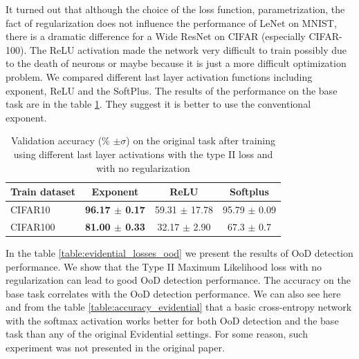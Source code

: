 \documentclass{article}
\begin{document}
It turned out that although the choice of the loss function, parametrization, the fact of regularization does not influence the performance of LeNet on MNIST, there is a dramatic difference for a Wide ResNet on CIFAR (especially CIFAR-100).
The ReLU activation made the network very difficult to train possibly due to the death of neurons or maybe because it is just a more difficult optimization problem.
We compared different last layer activation functions including exponent, ReLU and the SoftPlus.
The results of the performance on the base task are in the table \ref{table:last_layer_activation}.
They suggest it is better to use the conventional exponent.

\begin{table}[H]
  \caption{Validation accuracy (\% $\pm \sigma$) on the original task after training using different last layer activations with the type II loss and with no regularization}
  \label{table:last_layer_activation}
  \vskip 0.15in
  \begin{center}
  \begin{small}
    \begin{tabular}{ l | c c c }
      \toprule
      Train dataset & Exponent & ReLU & Softplus \\
      \midrule
      CIFAR10
      & \bf{96.17} {\tiny $\pm$ 0.17} & 59.31 {\tiny $\pm$ 17.78} & 95.79 {\tiny $\pm$ 0.09} \\
      CIFAR100
      & \bf{81.00} {\tiny $\pm$ 0.33} & 32.17 {\tiny $\pm$ 2.90} & 67.3 {\tiny $\pm$ 0.7} \\
      \bottomrule
    \end{tabular}
  \end{small}
  \end{center}
\end{table}

In the table \ref{table:evidential_losses_ood} we present the results of OoD detection performance.
We show that the Type II Maximum Likelihood loss with no regularization can lead to good OoD detection performance.
The accuracy on the base task correlates with the OoD detection performance.
We can also see here and from the table \ref{table:accuracy_evidential} that a basic cross-entropy network with the softmax activation works better for both OoD detection and the base task than any of the original Evidential settings.
For some reason, such experiment was not presented in the original paper.
\end{document}
